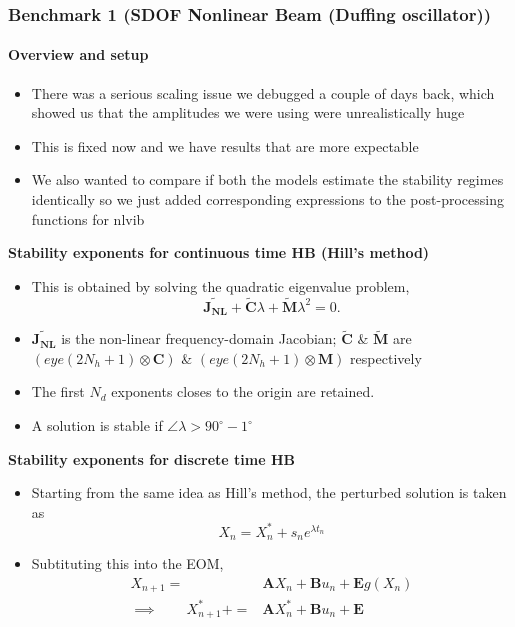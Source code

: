 \documentclass[aspectratio=169]{beamer}
\begin{document}
\begin{frame}[allowframebreaks]
  \frametitle{Benchmark 1 (SDOF Nonlinear Beam (Duffing oscillator))}
  \framesubtitle{Overview and setup}
  \begin{itemize}
  \item There was a serious scaling issue we debugged a couple of days
    back, which showed us that the amplitudes we were using were
    unrealistically huge
  \item This is fixed now and we have results that are more expectable
  \item We also wanted to compare if both the models estimate the
    stability regimes identically so we just added corresponding
    expressions to the post-processing functions for nlvib
  \end{itemize}
  \textbf{Stability exponents for continuous time HB (Hill's method)}
  \begin{itemize}
  \item This is obtained by solving the quadratic eigenvalue problem,
    \begin{equation}
      \label{eq:1}
      \mathbf{\tilde{J_{NL}}} + \mathbf{\tilde{C}} \lambda +
      \mathbf{\tilde{M}} \lambda^2 = 0.
    \end{equation}
  \item $\mathbf{\tilde{J_{NL}}}$ is the non-linear frequency-domain
    Jacobian; $\mathbf{\tilde{C}}$ \& $\mathbf{\tilde{M}}$ are
    $(eye(2N_h+1) \otimes \mathbf{C})$ \& $(eye(2N_h+1) \otimes
    \mathbf{M})$ respectively
  \item The first $N_d$ exponents closes to the origin are retained.
  \item A solution is stable if $\angle\lambda>90^\circ-1^\circ$
  \end{itemize}
  \textbf{Stability exponents for discrete time HB}
  \begin{itemize}
  \item Starting from the same idea as Hill's method, the perturbed
    solution is taken as
    \begin{equation}
      X_n = X^*_n + s_ne^{\lambda t_n}
    \end{equation}
  \item Subtituting this into the EOM,
    \begin{align}
      X_{n+1} =& \mathbf{A}X_n + \mathbf{B} u_n + \mathbf{E}
                g(X_n)\nonumber\\
      \implies\qquad X^*_{n+1} + =& \mathbf{A}X^*_n + \mathbf{B} u_n + \mathbf{E}

\end{align}
\end{itemize}
\end{frame}
\end{document}
